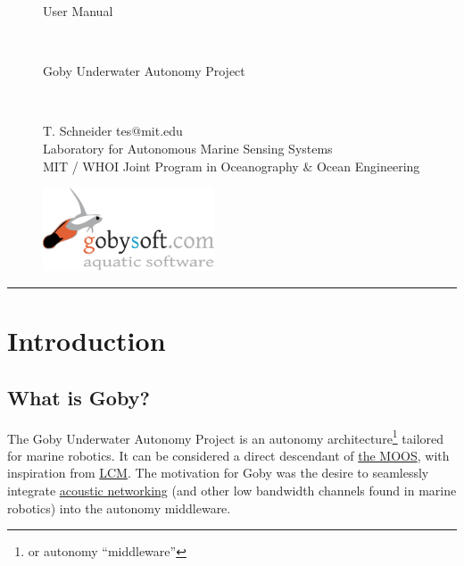 \documentclass[11pt, letterpaper]{article}
\begin{document}
\begin{figure}[H]
\begin{minipage}[b]{0.55\linewidth}
\begin{LARGE}
User Manual
\end{LARGE}
\vspace{0.5em}\\
\begin{Large}
Goby Underwater Autonomy Project
\end{Large}
\vspace{0.5em}\\
\begin{footnotesize}
T. Schneider tes@mit.edu \\
Laboratory for Autonomous Marine Sensing Systems \\
MIT / WHOI Joint Program in Oceanography \& Ocean Engineering
\end{footnotesize}
\end{minipage}
\hfill
\begin{minipage}[b]{0.3\linewidth}
\begin{flushright}
\includegraphics[width=2in]{gobysoft_logo} 
\end{flushright}
\end{minipage}
\end{figure}

\vspace{0.5em}
\rule{\textwidth}{1pt}
\vspace{0.5em}

\tableofcontents

\section{Introduction}

\subsection{What is Goby?}

The Goby Underwater Autonomy Project is an autonomy architecture\footnote{or autonomy ``middleware''} tailored for marine robotics. It can be considered a direct descendant of \href{http://www.robots.ox.ac.uk/~mobile/MOOS/wiki/pmwiki.php}{the MOOS}, with inspiration from  \href{http://code.google.com/p/lcm/}{LCM}. The motivation for Goby was the desire to seamlessly integrate \href{http://gobysoft.com/doc/acomms.html}{acoustic networking} (and other low bandwidth channels found in marine robotics) into the autonomy middleware.
\end{document}
